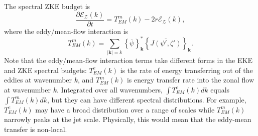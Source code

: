 \documentclass{jfm}
\begin{document}
The spectral ZKE budget is
\begin{equation}
\frac{\partial\mathcal{E}_{\mathcal{Z}}(k)}{\partial t}=T_{EM}^{m}(k)-2r\mathcal{E}_{\mathcal{Z}}(k),\label{eq:spectral_ZKE_budget}
\end{equation}
where the eddy/mean-flow interaction is
\begin{equation}
T_{EM}^{m}(k)=\underset{|\mathbf{k}|=k}{\sum}\left\{ \overline{\psi}\right\} _{\mathbf{k}}^{*}\left\{ \overline{J(\psi',\zeta')}\right\} _{\mathbf{k}}.
\end{equation}
Note that the eddy/mean-flow interaction terms take different forms in the EKE
and ZKE spectral budgets: $T_{EM}^{e}(k)$ is the rate of energy
transferring out of the eddies at wavenumber $k$, and $T_{EM}^{m}(k)$ is
energy transfer rate into the zonal flow at wavenumber $k$. Integrated
over all wavenumbers, $\int T_{EM}^{e}(k)dk$ equals $\int T_{EM}^{m}(k)dk$, but they can have different
spectral distributions. For example, $T_{EM}^{e}(k)$ may have a broad distribution over a range
of scales while $T_{EM}^{m}(k)$ narrowly peaks at the jet scale.
Physically, this would mean that the eddy-mean transfer is non-local.
\end{document}
